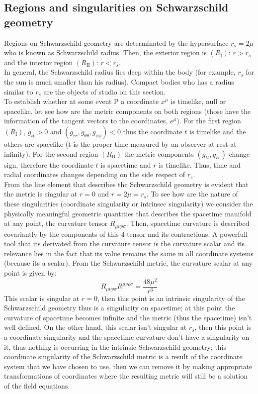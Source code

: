 \documentclass[letterpaper,11pt,onecolumn]{article}
\begin{document}
\subsection{Regions and singularities on Schwarzschild geometry}
Regions on Schwarzschild geometry are determinated by the hypersurface $r_s=2\mu$ who is known as Schwarzschild radius. Then, the exterior region is $(R_{\mathrm{I}})$: $r>r_s$ and the interior region $(R_{\mathrm{II}})$: $r<r_s$.\\
In general, the Schwarzschild radius lies deep within the body (for example, $r_s$ for the sun is much smaller than his radius). Compact bodies who has a radius similar to $r_s$ are the objects of studio on this section.\\
To establish whether at some event P a
 coordinate $x^\mu$ is timelike, null or spacelike, let see how are the metric components on both regions (those have the information of the tangent vectors to the coordinates, $e^\mu$). For the first region $(R_{\mathrm{I}})$, $g_{tt}>0$ and $(g_{rr}, g_{\theta \theta}, g_{\phi \phi})<0$  thus the coordinate $t$ is timelike and the others are spacelike (t is the proper time measured by an observer at rest at infinity).  For the second region $(R_{\mathrm{II}})$ the metric components $(g_{tt}, g_{rr})$ change sign, therefore the coordinate $t$ is spacetime and $r$ is timelike. Thus, time and radial coordinates changes depending on the side respect of $r_s$.\\
From the line element that describes the Schwarzschild geometry is evident that the metric is singular at $r=0$ and $r=2\mu=r_s$. To see how are the nature of these singularities (coordinate singularity or intrinsec singularity) we consider the physically meaningful geometric quantities that describes the spacetime manifold at any point, the curvature tensor $R_{\mu\nu\rho\sigma}$. Then, spacetime curvature
is described covariantly by the components of this 4-tensor and its contractions. A powerfull tool that its derivated from the curvature tensor is the curvature scalar and its relevance lies in the fact that its value remains the same in all coordinate systems (because its a scalar). From the Schwarzschild metric, the curvature scalar at any point is given by:
\begin{equation*}
    R_{\mu\nu\rho\sigma}R^{\mu\nu\rho\sigma}=\frac{48\mu^2}{r^6}
\end{equation*}
This scalar is singular at $r=0$, then this point is an intrinsic singularity of the Schwarzschild geometry thus is a singularity on spacetime; at this point the curvature of spacetime becomes infinite and the metric (thus the spacetime) isn't well defined. On the other hand, this scalar isn't singular at $r_s$, then this point is a coordinate singularity and the spacetime curvature don't have a singularity on it, thus nothing is occurring in the intrinsic Schwarzschild geometry; this coordinate singularity of the Schwarzschild metric is a result of the coordinate system that we have chosen to use, then we can remove it by making appropriate transformations
of coordinates where the resulting metric will still be a solution of the field equations.
\end{document}
